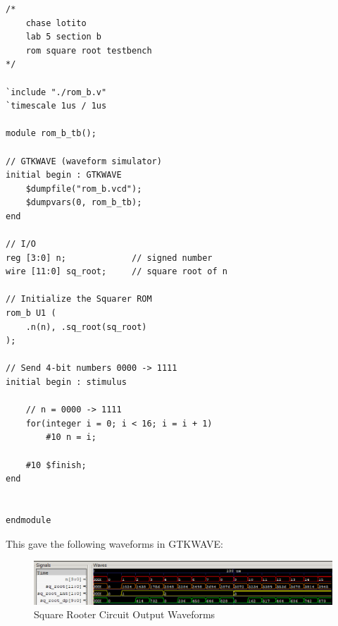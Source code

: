 \documentclass{article}
\begin{document}
\begin{lstlisting}
/*
    chase lotito
    lab 5 section b
    rom square root testbench
*/

`include "./rom_b.v"
`timescale 1us / 1us

module rom_b_tb();

// GTKWAVE (waveform simulator)
initial begin : GTKWAVE
    $dumpfile("rom_b.vcd");
    $dumpvars(0, rom_b_tb);
end

// I/O
reg [3:0] n;             // signed number
wire [11:0] sq_root;     // square root of n

// Initialize the Squarer ROM
rom_b U1 (
    .n(n), .sq_root(sq_root)
);

// Send 4-bit numbers 0000 -> 1111
initial begin : stimulus

    // n = 0000 -> 1111
    for(integer i = 0; i < 16; i = i + 1)
        #10 n = i;

    #10 $finish;
end


endmodule
\end{lstlisting}

This gave the following waveforms in GTKWAVE:

\begin{figure}[!ht] 
    \centering
    \includegraphics*[width = 15.1cm]{rom_b_waves.png}
    \caption{Square Rooter Circuit Output Waveforms}
    \label{fig:squareRooterWaves}
\end{figure}    
\end{document}
